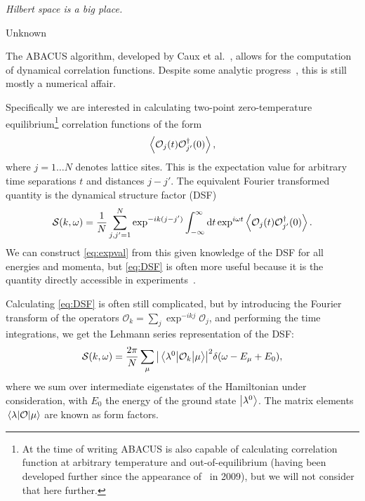 \documentclass[11pt, a4paper]{report} %
\begin{document}
\epigraph{\textit{Hilbert space is a big place.}}{Unknown}

The ABACUS algorithm, developed by Caux et al.~\cite{Caux2005, Caux2007, Caux2007a, Caux2005a}, allows for the computation of dynamical correlation functions.
Despite some analytic progress~\cite{Nardis2016,Nardis2015,slavnov90_noneq_time_curren_correl_funct}, this is still mostly a numerical affair.

Specifically we are interested in calculating two-point zero-temperature equilibrium\footnote{At the time of writing ABACUS is also capable of calculating correlation function at arbitrary temperature and out-of-equilibrium (having been developed further since the appearance of~\cite{Caux2009} in 2009), but we will not consider that here further.} correlation functions of the form
\begin{equation}\label{eq:expval}
	\expval{\mathcal{O}_j(t)\mathcal{O}_{j'}^{\dagger}(0)},
\end{equation}
where \(j=1\ldots N\) denotes lattice sites.
This is the expectation value for arbitrary time separations $t$ and distances $j-j'$.
The equivalent Fourier transformed quantity is the dynamical structure factor (DSF)
\begin{equation}\label{eq:DSF}
	\mathcal{S}(k,\omega) = \frac{1}{N} \sum_{j,j'=1}^{N} \exp^{-ik(j-j')} \int_{-\infty}^{\infty}\dd t \exp^{i\omega t}\expval{\mathcal{O}_j(t)\mathcal{O}_{j'}^{\dagger}(0)}.
\end{equation}
We can construct \cref{eq:expval} from this given knowledge of the DSF for all energies and momenta, but \cref{eq:DSF} is often more useful because it is the quantity directly accessible in experiments~\cite{Caux2009,Caux2007a}.

Calculating \cref{eq:DSF} is often still complicated, but by introducing the Fourier transform of the operators $\mathcal{O}_k=\sum_j \exp^{-ikj} \mathcal{O}_j$, and performing the time integrations, we get the Lehmann series representation of the DSF:
\begin{equation}
  \mathcal{S}(k,\omega) = \frac{2\pi}{N}\sum_{\mu}\abs{\mel{\lambda^0}{\mathcal{O}_k}{\mu}}^2 \delta(\omega-E_{\mu}+E_0), 
\end{equation}
where we sum over intermediate eigenstates of the Hamiltonian under consideration, with $E_0$ the energy of the ground state $\ket{\lambda^0}$.
The matrix elements $\mel{\lambda}{\mathcal{O}}{\mu}$ are known as form factors.
\end{document}
